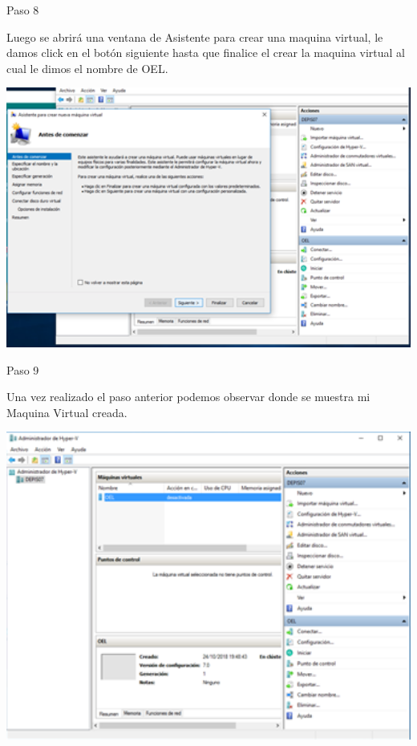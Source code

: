\begin{itemize}
\begin{center}
    Paso 8
\end{center}


    Luego se abrirá una ventana de Asistente para crear una maquina virtual, le damos click en el botón siguiente hasta que finalice el crear la maquina virtual al cual le dimos el nombre de OEL.\\
	\begin{center}
	\includegraphics[width=15cm]{./Imagenes/imagen8} 
	\end{center}


\end{itemize} 

\begin{itemize}
\begin{center}
    Paso 9
\end{center}


    Una vez realizado el paso anterior podemos observar donde se muestra mi Maquina Virtual creada.\\
	\begin{center}
	\includegraphics[width=15cm]{./Imagenes/imagen9} 
	\end{center}

\end{itemize} 


  
  
  

